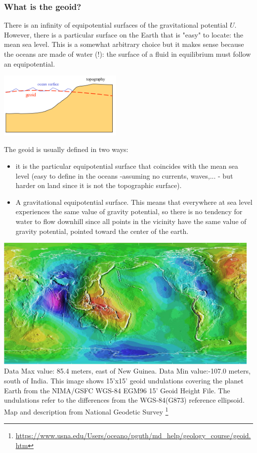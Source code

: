 
\subsubsection{What is the geoid?}


There is an infinity of equipotential surfaces of the gravitational potential $U$.
However, there is a particular surface on the Earth that is "easy" to locate: 
the mean sea level. This is a somewhat arbitrary choice  
but it makes sense because the oceans are made of water (!): 
the surface of a fluid in equilibrium must follow an equipotential.

\begin{center}
\includegraphics[width=6cm]{images/geoid/geoid1}
\end{center}

The geoid is usually defined in two ways:
\begin{itemize}
\item it is the particular equipotential surface that coincides with the mean sea level
 (easy to define in the oceans -assuming no currents, waves,... - but harder on land since 
it is not the topographic surface).
\item A gravitational equipotential surface. This means that everywhere at sea level experiences the same value of gravity potential, so there is no tendency for water to flow downhill since all points in the vicinity have the same value of gravity potential, pointed toward the center of the earth.
\end{itemize}

\begin{center}
\includegraphics[width=13cm]{images/geoid/ww15mgh}\\
{\captionfont Data Max value: 85.4 meters, east of New Guinea. Data Min value:-107.0 meters, south of India. 
This image shows 15'x15' geoid undulations covering the planet Earth 
from the NIMA/GSFC WGS-84 EGM96 15' Geoid Height File. The undulations refer to 
the differences from the WGS-84(G873) reference ellipsoid. 
Map and description from National Geodetic Survey
\footnote{\url{https://www.usna.edu/Users/oceano/pguth/md_help/geology_course/geoid.htm}}
}
\end{center}

